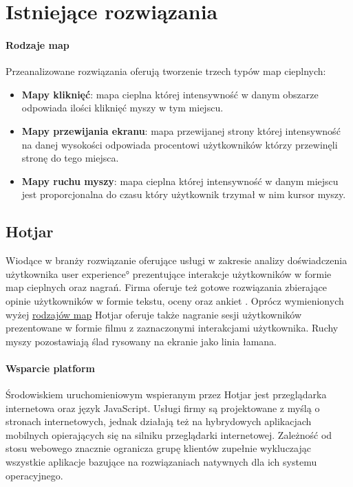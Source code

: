 \section{Istniejące rozwiązania}

\paragraph{Rodzaje map}
\label{par:heat_map_types}
Przeanalizowane rozwiązania oferują tworzenie trzech typów map cieplnych:

\begin{itemize}
	\item {\bf Mapy kliknięć}: mapa cieplna której intensywność w danym obszarze odpowiada ilości kliknięć myszy w tym miejscu.
	\item {\bf Mapy przewijania ekranu}: mapa przewijanej strony której intensywność na danej wysokości odpowiada procentowi użytkowników którzy przewinęli stronę do tego miejsca.
	\item {\bf Mapy ruchu myszy}: mapa cieplna której intensywność w danym miejscu jest proporcjonalna do czasu który użytkownik trzymał w nim kursor myszy.
\end{itemize}

\subsection{Hotjar}
Wiodące w branży rozwiązanie oferujące usługi w zakresie analizy doświadczenia użytkownika \ang{user experience} prezentujące interakcje użytkowników w formie map cieplnych oraz nagrań. Firma oferuje też gotowe rozwiązania zbierające opinie użytkowników w formie tekstu, oceny oraz ankiet \cite{Hotjar_website}. Oprócz wymienionych wyżej \hyperref[{par:heat_map_types}]{rodzajów map} Hotjar oferuje także nagranie sesji użytkowników prezentowane w formie filmu z zaznaczonymi interakcjami użytkownika. Ruchy myszy pozostawiają ślad rysowany na ekranie jako linia łamana.

\paragraph{Wsparcie platform} 
Środowiskiem uruchomieniowym wspieranym przez Hotjar jest przeglądarka internetowa oraz język JavaScript. Usługi firmy są projektowane z myślą o stronach internetowych, jednak działają też na hybrydowych aplikacjach mobilnych opierających się na silniku przeglądarki internetowej. Zależność od stosu webowego znacznie ogranicza grupę klientów zupełnie wykluczając wszystkie aplikacje bazujące na rozwiązaniach natywnych dla ich systemu operacyjnego.

